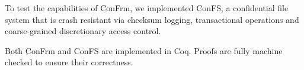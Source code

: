 To test the capabilities of ConFrm, we implemented ConFS, a confidential file system that is crash resistant via checksum logging, transactional operations and coarse-grained discretionary access control. 

Both ConFrm and ConFS are implemented in Coq. Proofs are fully machine checked to ensure their correctness.


